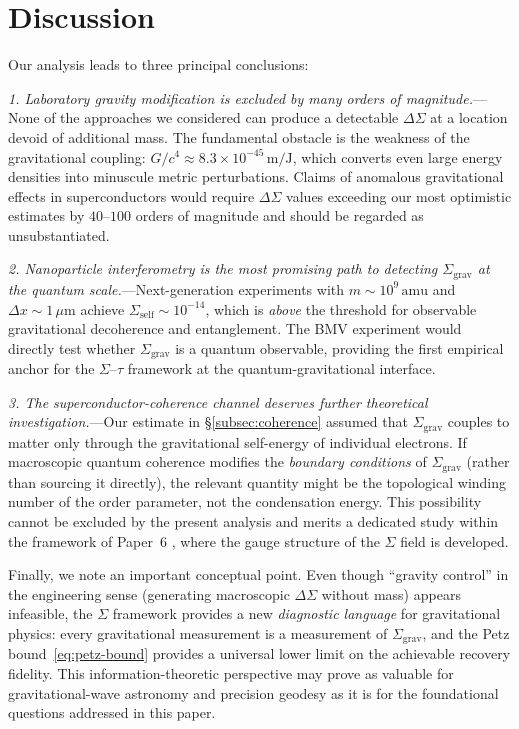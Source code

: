 \documentclass[prd,twocolumn,superscriptaddress,longbibliography,floatfix]{revtex4-2}
\newcommand{\tauasym}{\tau}
\newcommand{\Sgrav}{\Sigma_{\mathrm{grav}}}
\newcommand{\DSigma}{\Delta\Sigma}
\begin{document}
\section{Discussion}
\label{sec:discussion}

Our analysis leads to three principal conclusions:

\textit{1. Laboratory gravity modification is excluded by many orders
of magnitude.}---None of the approaches we considered can produce a
detectable $\DSigma$ at a location devoid of additional mass.  The
fundamental obstacle is the weakness of the gravitational coupling:
$G/c^4 \approx 8.3 \times 10^{-45}\,\mathrm{m/J}$, which converts
even large energy densities into minuscule metric perturbations.
Claims of anomalous gravitational effects in superconductors
\cite{Podkletnov1992,Tajmar2006} would require $\DSigma$ values
exceeding our most optimistic estimates by $40$--$100$ orders of
magnitude and should be regarded as unsubstantiated.

\textit{2. Nanoparticle interferometry is the most promising path to
detecting $\Sgrav$ at the quantum scale.}---Next-generation
experiments with $m \sim 10^9\,\mathrm{amu}$ and
$\Delta x \sim 1\,\mu\mathrm{m}$ achieve
$\Sigma_{\mathrm{self}} \sim 10^{-14}$, which is \emph{above} the
threshold for observable gravitational decoherence and entanglement.
The BMV experiment \cite{Bose2017,Marletto2017} would directly test
whether $\Sgrav$ is a quantum observable, providing the first
empirical anchor for the $\Sigma$--$\tauasym$ framework at the
quantum-gravitational interface.

\textit{3. The superconductor-coherence channel deserves further
theoretical investigation.}---Our estimate in
\S\ref{subsec:coherence} assumed that $\Sgrav$ couples to matter
only through the gravitational self-energy of individual electrons.
If macroscopic quantum coherence modifies the \emph{boundary
conditions} of $\Sgrav$ (rather than sourcing it directly), the
relevant quantity might be the topological winding number of the
order parameter, not the condensation energy.  This possibility
cannot be excluded by the present analysis and merits a dedicated
study within the framework of Paper~6 \cite{Huang2026paper6},
where the gauge structure of the $\Sigma$ field is developed.

Finally, we note an important conceptual point.  Even though
``gravity control'' in the engineering sense (generating macroscopic
$\DSigma$ without mass) appears infeasible, the $\Sigma$ framework
provides a new \emph{diagnostic language} for gravitational physics:
every gravitational measurement is a measurement of $\Sgrav$, and
the Petz bound~\eqref{eq:petz-bound} provides a universal lower
limit on the achievable recovery fidelity.  This
information-theoretic perspective may prove as valuable for
gravitational-wave astronomy and precision geodesy as it is for
the foundational questions addressed in this paper.
\end{document}
